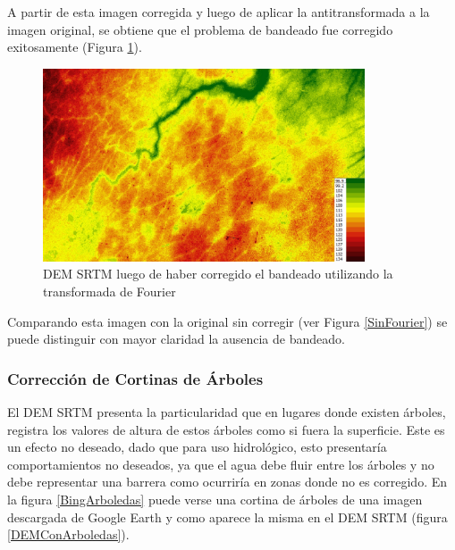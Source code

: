 \documentclass[10pt,a4paper, twoside]{report}
\newcounter{subsubsubsection}[subsubsection]
\begin{document}



A partir de esta imagen corregida y luego de aplicar la antitransformada a la imagen original, se obtiene que el problema de bandeado fue corregido exitosamente (Figura \ref{SRTMSinFourierCorrected}).

\begin{figure}[H]
   \centering      
   \includegraphics[width=0.85\textwidth]{imagenes/SRTMSinFourierCorrected.jpg}
 \caption{DEM SRTM luego de haber corregido el bandeado utilizando la transformada de Fourier}
 \label{SRTMSinFourierCorrected}
\end{figure}

Comparando esta imagen con la original sin corregir (ver Figura \ref{SinFourier}) se puede distinguir con mayor claridad la ausencia de bandeado.


\subsubsection{Corrección de Cortinas de Árboles}
\label{correccionACortinasDeArboles}

El DEM SRTM presenta la particularidad que en lugares donde existen árboles, registra los valores de altura de estos árboles como si fuera la superficie. Este es un efecto no deseado, dado que para uso hidrológico, esto presentaría comportamientos no deseados, ya que el agua debe fluir entre los árboles y no debe representar una barrera como ocurriría en zonas donde no es corregido. En la figura \ref{BingArboledas} puede verse una cortina de árboles de una imagen descargada de Google Earth y como aparece la misma en el DEM SRTM (figura \ref{DEMConArboledas}).
\end{document}
